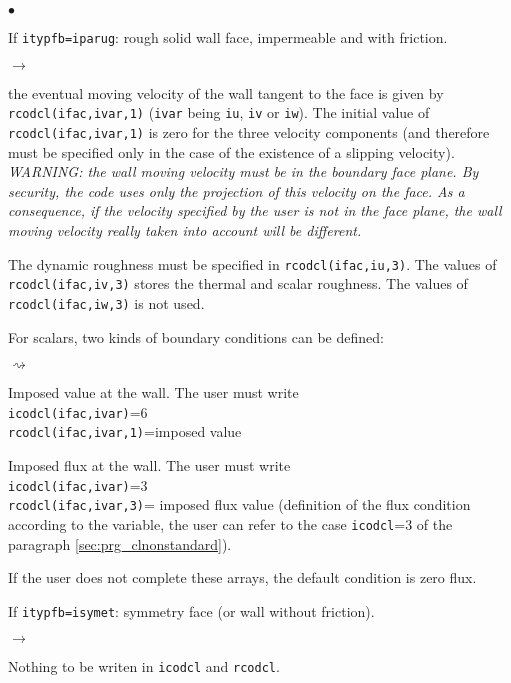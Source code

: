 {{{\begin{list}{$\bullet$}{}
\item If \texttt{itypfb=iparug}: rough solid wall face, impermeable and with friction.

\begin{list}{$\rightarrow$}{}
\item the eventual moving velocity of the wall tangent to the face is
      given by \texttt{rcodcl(ifac,ivar,1)} (\texttt{ivar} being
      \texttt{iu}, \texttt{iv} or \texttt{iw}). The initial
      value of \texttt{rcodcl(ifac,ivar,1)} is zero for
      the three velocity components (and therefore must be specified
      only in the case of the existence of a slipping velocity). \\
{\em WARNING: the wall moving velocity must be in the boundary face
      plane. By security, the code uses only the projection of this
      velocity on the face. As a consequence, if the velocity specified
      by the user is not in the face plane, the wall moving velocity really
      taken into account will be different.}
\item The dynamic roughness must be specified in \texttt{rcodcl(ifac,iu,3)}.
      The values of \texttt{rcodcl(ifac,iv,3)} stores the thermal and scalar roughness.
      The values of \texttt{rcodcl(ifac,iw,3)} is not used.
\item For scalars, two kinds of boundary conditions can be defined:
\begin{list}{$\rightsquigarrow$}{}
\item Imposed value at the wall. The user must write\\
\hspace*{1cm}\texttt{icodcl(ifac,ivar)}=6\\
\hspace*{1cm}\texttt{rcodcl(ifac,ivar,1)}=imposed value\\
\item Imposed flux at the wall. The user must write\\
\hspace*{1cm}\texttt{icodcl(ifac,ivar)}=3\\
\hspace*{1cm}\texttt{rcodcl(ifac,ivar,3)}= imposed flux value (definition
      of the flux condition according to the variable, the user can refer to the
      case \texttt{icodcl}=3 of the paragraph \ref{sec:prg_clnonstandard}).
\item If the user does not complete these arrays, the default condition
      is zero flux.
\end{list}
\end{list}
\item If \texttt{itypfb=isymet}: symmetry face (or wall without friction).
\begin{list}{$\rightarrow$}{}
\item Nothing to be writen in \texttt{icodcl} and  \texttt{rcodcl}.
\end{list}


\end{list}}}}
